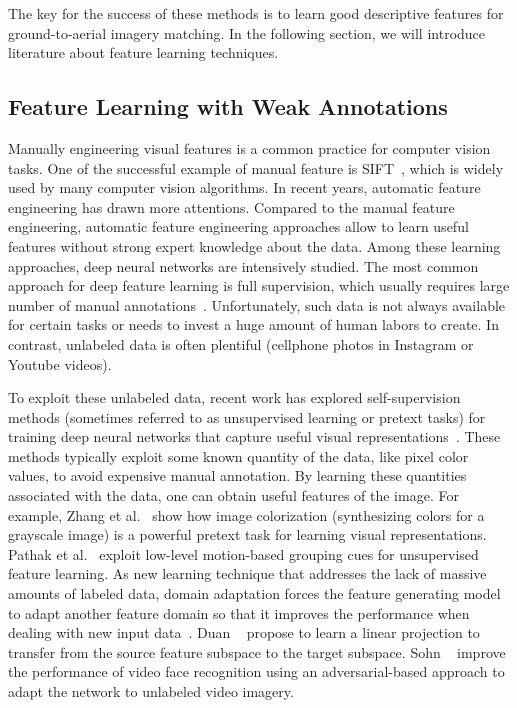 The key for the success of these methods is to learn good descriptive
features for ground-to-aerial imagery matching. In the following
section, we will introduce literature about feature learning techniques.

\subsection{Feature Learning with Weak Annotations}

Manually engineering visual features is a common practice for
computer vision tasks. One of the successful example of manual
feature is SIFT~\cite{lowe1999object}, which is widely used by many
computer vision algorithms.
In recent years, automatic feature engineering has drawn more
attentions. Compared to the manual feature
engineering, automatic feature engineering approaches allow to learn
useful features without strong expert knowledge about the data. Among
these learning approaches, deep neural networks are intensively studied.
The most common approach for deep feature learning is full
supervision, which usually requires large number of manual
annotations~\cite{yosinski2014transferable,zhou2016learning,wen2016discriminative}.
Unfortunately, such data is not always available for certain tasks or
needs to invest a huge amount of human labors to create.  In contrast,
unlabeled data is often plentiful (\ie cellphone photos in Instagram
or Youtube videos).

To exploit these unlabeled data, recent work has explored
self-supervision methods (sometimes referred to as unsupervised learning or
pretext tasks) for training deep neural networks that capture useful
visual representations~\cite{doersch2015unsupervised,pathak2016context}. 
These methods typically
exploit some known quantity of the data, like pixel color values, to
avoid expensive manual annotation.
By learning these quantities associated with the data, one
can obtain useful features of the image.
For example, Zhang et al.~\cite{zhang2016colorful} show how image
colorization (synthesizing colors for a grayscale image) is a powerful
pretext task for learning visual representations. Pathak et
al.~\cite{pathak2017learning} exploit low-level motion-based grouping
cues for unsupervised feature learning.  
%
As new learning technique that addresses the lack of massive amounts
of labeled data, domain adaptation forces the feature generating model
to adapt another feature domain so that it improves the performance
when dealing with new input
data~\cite{fernando2013unsupervised,fernando2015joint,saenko2010adapting,wang2016actions,tinghui2016flow}.
Duan \etal~\cite{duan2012learning} propose to learn a linear
projection to transfer from the source feature subspace to the target
subspace. Sohn \etal~\cite{sohn2017unsupervised} improve the
performance of video face recognition using an adversarial-based
approach to adapt the network to unlabeled video imagery.

